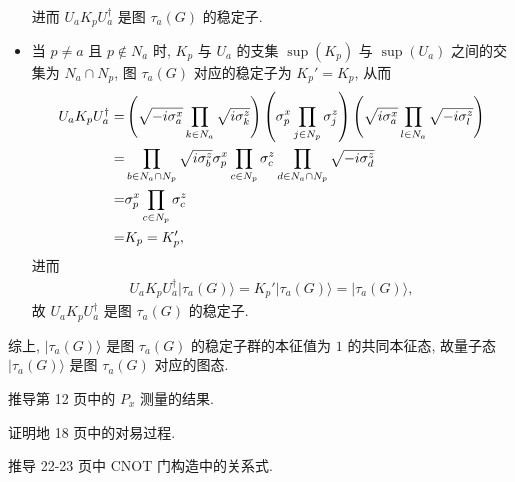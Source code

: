 \documentclass{assignment}
\begin{document}
\begin{pf}
\begin{itemize}
\begin{align}
        \end{align}
        进而 $U_aK_pU_a^{\dagger}$ 是图 $\tau_a(G)$ 的稳定子.
        \item 当 $p\neq a$ 且 $p\notin N_a$ 时, $K_p$ 与 $U_a$ 的支集 $\sup(K_p)$ 与 $\sup(U_a)$ 之间的交集为 $N_a\cap N_p$, 图 $\tau_a(G)$ 对应的稳定子为 $K_p'=K_p$, 从而
        \begin{align}
            \notag U_aK_pU_a^{\dagger}=&\left(\sqrt{-i\sigma_a^x}\prod_{k\in N_a}\sqrt{i\sigma_k^z}\right)\left(\sigma_p^x\prod_{j\in N_p}\sigma_j^z\right)\left(\sqrt{i\sigma_a^x}\prod_{l\in N_a}\sqrt{-i\sigma_l^z}\right)\\
            \notag=&\prod_{b\in N_a\cap N_p}\sqrt{i\sigma_b^z}\sigma_p^x\prod_{c\in N_p}\sigma_c^z\prod_{d\in N_a\cap N_p}\sqrt{-i\sigma_d^z}\\
            \notag=&\sigma_p^x\prod_{c\in N_p}\sigma_c^z\\
            =&K_p=K_p',
        \end{align}
        进而
        \begin{align}
            U_aK_pU_a^{\dagger}\lvert\tau_a(G)\rangle=K_p'\lvert\tau_a(G)\rangle=\lvert\tau_a(G)\rangle,
        \end{align}
        故 $U_aK_pU_a^{\dagger}$ 是图 $\tau_a(G)$ 的稳定子.
    \end{itemize}

    综上, $\lvert\tau_a(G)\rangle$ 是图 $\tau_a(G)$ 的稳定子群的本征值为 $1$ 的共同本征态, 故量子态 $\lvert\tau_a(G)\rangle$ 是图 $\tau_a(G)$ 对应的图态.
\end{pf}

\begin{prob}
    推导第 12 页中的 $P_x$ 测量的结果.
\end{prob}
\begin{sol}
    
\end{sol}

\begin{prob}
    证明地 18 页中的对易过程.
\end{prob}
\begin{sol}
    
\end{sol}

\begin{prob}
    推导 22-23 页中 CNOT 门构造中的关系式.
\end{prob}
\begin{sol}
    
\end{sol}
\end{document}
